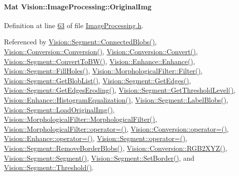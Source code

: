 \hypertarget{class_vision_1_1_image_processing_a77c370dab270158a4e9c634e2d3f48e7}{}
\paragraph[{Original\+Img}]{\setlength{\rightskip}{0pt plus 5cm}Mat Vision\+::\+Image\+Processing\+::\+Original\+Img}\label{class_vision_1_1_image_processing_a77c370dab270158a4e9c634e2d3f48e7}


Definition at line \hyperlink{_image_processing_8h_source_l00063}{63} of file \hyperlink{_image_processing_8h_source}{Image\+Processing.\+h}.



Referenced by \hyperlink{_segment_8cpp_source_l00688}{Vision\+::\+Segment\+::\+Connected\+Blobs()}, \hyperlink{_conversion_8cpp_source_l00022}{Vision\+::\+Conversion\+::\+Conversion()}, \hyperlink{_conversion_8cpp_source_l00066}{Vision\+::\+Conversion\+::\+Convert()}, \hyperlink{_segment_8cpp_source_l00153}{Vision\+::\+Segment\+::\+Convert\+To\+B\+W()}, \hyperlink{_enhance_8cpp_source_l00020}{Vision\+::\+Enhance\+::\+Enhance()}, \hyperlink{_segment_8cpp_source_l00615}{Vision\+::\+Segment\+::\+Fill\+Holes()}, \hyperlink{_morphological_filter_8cpp_source_l00089}{Vision\+::\+Morphological\+Filter\+::\+Filter()}, \hyperlink{_segment_8cpp_source_l00534}{Vision\+::\+Segment\+::\+Get\+Blob\+List()}, \hyperlink{_segment_8cpp_source_l00389}{Vision\+::\+Segment\+::\+Get\+Edges()}, \hyperlink{_segment_8cpp_source_l00483}{Vision\+::\+Segment\+::\+Get\+Edges\+Eroding()}, \hyperlink{_segment_8cpp_source_l00069}{Vision\+::\+Segment\+::\+Get\+Threshold\+Level()}, \hyperlink{_enhance_8cpp_source_l00277}{Vision\+::\+Enhance\+::\+Histogram\+Equalization()}, \hyperlink{_segment_8cpp_source_l00316}{Vision\+::\+Segment\+::\+Label\+Blobs()}, \hyperlink{_segment_8cpp_source_l00056}{Vision\+::\+Segment\+::\+Load\+Original\+Img()}, \hyperlink{_morphological_filter_8cpp_source_l00013}{Vision\+::\+Morphological\+Filter\+::\+Morphological\+Filter()}, \hyperlink{_morphological_filter_8cpp_source_l00062}{Vision\+::\+Morphological\+Filter\+::operator=()}, \hyperlink{_conversion_8cpp_source_l00041}{Vision\+::\+Conversion\+::operator=()}, \hyperlink{_enhance_8cpp_source_l00062}{Vision\+::\+Enhance\+::operator=()}, \hyperlink{_segment_8cpp_source_l00041}{Vision\+::\+Segment\+::operator=()}, \hyperlink{_segment_8cpp_source_l00245}{Vision\+::\+Segment\+::\+Remove\+Border\+Blobs()}, \hyperlink{_conversion_8cpp_source_l00207}{Vision\+::\+Conversion\+::\+R\+G\+B2\+X\+Y\+Z()}, \hyperlink{_segment_8cpp_source_l00020}{Vision\+::\+Segment\+::\+Segment()}, \hyperlink{_segment_8cpp_source_l00208}{Vision\+::\+Segment\+::\+Set\+Border()}, and \hyperlink{_segment_8cpp_source_l00176}{Vision\+::\+Segment\+::\+Threshold()}.

